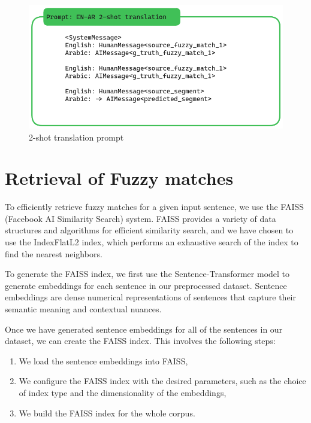 \documentclass[twocolumn]{article}
\begin{document}
\begin{figure}
	\centering
	\includegraphics[width=\linewidth, ]{figs/prompt_two_shot_translation} %
	\caption{ 2-shot translation prompt}
	
	\label{fig:duck_55}
\end{figure}


\section{Retrieval of Fuzzy matches}
To efficiently retrieve fuzzy matches for a given input sentence, we use the FAISS (Facebook AI Similarity Search) system. FAISS provides a variety of data structures and algorithms for efficient similarity search, and we have chosen to use the IndexFlatL2 index, which performs an exhaustive search of the index to find the nearest neighbors.

To generate the FAISS index, we first use the Sentence-Transformer model to generate embeddings for each sentence in our preprocessed dataset. Sentence embeddings are dense numerical representations of sentences that capture their semantic meaning and contextual nuances.


Once we have generated sentence embeddings for all of the sentences in our dataset, we can create the FAISS index. This involves the following steps:


\begin{enumerate}
	\item We load the sentence embeddings into FAISS,
	
	
	\item We configure the FAISS index with the desired parameters, such as the choice of index type and the dimensionality of the embeddings,
	
	
	\item We build the FAISS index for the whole corpus.
	
\end{enumerate}
\end{document}
